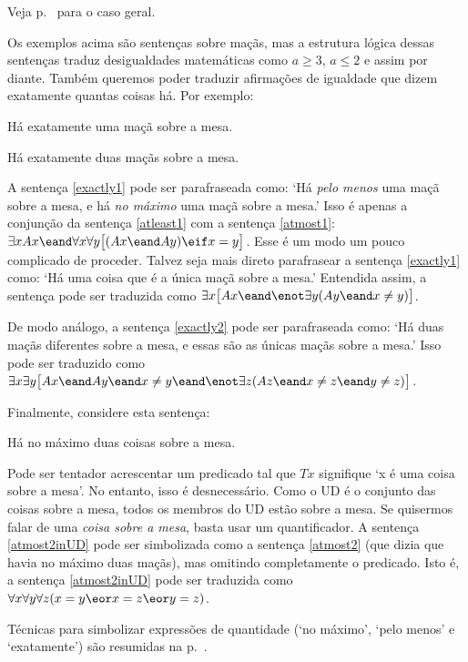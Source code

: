 Veja p.~\pageref{summary.atmost} para o caso geral.

Os exemplos acima são sentenças sobre maçãs, mas a estrutura lógica dessas sentenças traduz desigualdades matemáticas como $a\geq 3$, $a \leq 2$ e assim por diante. Também queremos poder traduzir afirmações de igualdade que dizem exatamente quantas coisas há. Por exemplo:
\begin{earg}
\item[\ex{exactly1}] Há exatamente uma maçã sobre a mesa.
\item[\ex{exactly2}] Há exatamente duas maçãs sobre a mesa.
\end{earg}

A sentença \ref{exactly1} pode ser parafraseada como: `Há \emph{pelo menos} uma maçã sobre a mesa, e há \emph{no máximo} uma maçã sobre a mesa.' Isso é apenas a conjunção da sentença \ref{atleast1} com a sentença \ref{atmost1}: $\exists x Ax \eand \forall x\forall y\bigl[(Ax \eand Ay) \eif x=y\bigr]$. Esse é um modo um pouco complicado de proceder. Talvez seja mais direto parafrasear a sentença \ref{exactly1} como: `Há uma coisa que é a única maçã sobre a mesa.' Entendida assim, a sentença pode ser traduzida como $\exists x\bigl[Ax \eand \enot\exists y(Ay \eand x\neq y)\bigr]$.

De modo análogo, a sentença \ref{exactly2} pode ser parafraseada como: `Há duas maçãs diferentes sobre a mesa, e essas são as únicas maçãs sobre a mesa.' Isso pode ser traduzido como $\exists x\exists y\bigl[Ax \eand Ay \eand x\neq y \eand \enot\exists z(Az \eand x\neq z \eand y\neq z)\bigr]$.

Finalmente, considere esta sentença:
\begin{earg}
\item[\ex{atmost2inUD}] Há no máximo duas coisas sobre a mesa.
\end{earg}
Pode ser tentador acrescentar um predicado tal que $Tx$ signifique `x é uma coisa sobre a mesa'. No entanto, isso é desnecessário. Como o UD é o conjunto das coisas sobre a mesa, todos os membros do UD estão sobre a mesa. Se quisermos falar de uma \emph{coisa sobre a mesa}, basta usar um quantificador. A sentença \ref{atmost2inUD} pode ser simbolizada como a sentença \ref{atmost2} (que dizia que havia no máximo duas maçãs), mas omitindo completamente o predicado. Isto é, a sentença \ref{atmost2inUD} pode ser traduzida como $\forall x \forall y \forall z(x=y \eor x=z \eor y=z)$.

Técnicas para simbolizar expressões de quantidade (`no máximo', `pelo menos' e `exatamente') são resumidas na p.~\pageref{summary.atleast}.


